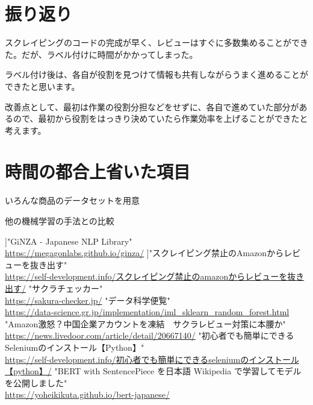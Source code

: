 \documentclass[a4paper,11pt,titlepage]{jsarticle}
\begin{document}
\section{振り返り}
スクレイピングのコードの完成が早く、レビューはすぐに多数集めることができた。だが、ラベル付けに時間がかかってしまった。

ラベル付け後は、各自が役割を見つけて情報も共有しながらうまく進めることができたと思います。

改善点として、最初は作業の役割分担などをせずに、各自で進めていた部分があるので、最初から役割をはっきり決めていたら作業効率を上げることができたと考えます。

\section{時間の都合上省いた項目}
いろんな商品のデータセットを用意

他の機械学習の手法との比較

\begin{thebibliography}{9}
]"GiNZA - Japanese NLP Library"\\
 \url{https://megagonlabs.github.io/ginza/}
 ]"スクレイピング禁止のAmazonからレビューを抜き出す"\\
 \url{https://self-development.info/スクレイピング禁止のamazonからレビューを抜き出す/}
 "サクラチェッカー"\\
 \url{https://sakura-checker.jp/}
"データ科学便覧"\\
 \url{https://data-science.gr.jp/implementation/iml_sklearn_random_forest.html}
"Amazon激怒？中国企業アカウントを凍結　サクラレビュー対策に本腰か"\\
 \url{https://news.livedoor.com/article/detail/20667140/}
"初心者でも簡単にできるSeleniumのインストール【Python】"\\
 \url{https://self-development.info/初心者でも簡単にできるseleniumのインストール【python】/}
"BERT with SentencePiece を日本語 Wikipedia で学習してモデルを公開しました"\\
 \url{https://yoheikikuta.github.io/bert-japanese/}

\end{thebibliography}
\end{document}
